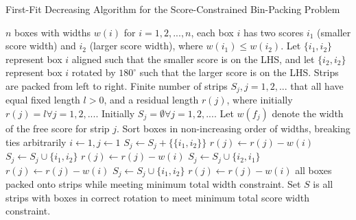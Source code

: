 \documentclass[oribibl]{llncs}
\begin{document}
\begin{algorithm}[H]
\caption{First-Fit Decreasing Algorithm for the Score-Constrained Bin-Packing Problem}
\label{alg:ffdapprox}
	\begin{algorithmic}[1]
	\Require $n$ boxes with widths $w(i)$ for $i = 1,2,...,n$, each box $i$ has two scores $i_1$ (smaller score width) and $i_2$ (larger score width), where $w(i_1) \leq w(i_2)$. Let $\{i_1, i_2\}$ represent box $i$ aligned such that the smaller score is on the LHS, and let $\{i_2, i_2\}$ represent box $i$ rotated by $180^{\circ}$ such that the larger score is on the LHS. Strips are packed from left to right. Finite number of strips $S_j, j = 1, 2, ...$ that all have equal fixed length $l > 0$, and a residual length $r(j)$, where initially $r(j) = l \forall j = 1, 2, ...$. Initially $S_j = \emptyset \forall j = 1, 2,...$. Let $w(f_j)$ denote the width of the free score for strip $j$.   
	\State Sort boxes in non-increasing order of widths, breaking ties arbitrarily
	\State $i \gets 1, j \gets 1$
	\State $S_j \gets S_j + \{\{i_1, i_2\}\}$
	\State $r(j) \gets r(j) - w(i)$
					\IndIndIndStatex $S_j \gets S_j \cup \{i_1, i_2\}$
					\IndIndIndStatex $r(j) \gets r(j) - w(i)$
					\IndIndIndStatex \Break
					\IndIndIndStatex $S_j \gets S_j \cup \{i_2, i_1\}$
					\IndIndIndStatex $r(j) \gets r(j) - w(i)$
					\IndIndIndStatex \Break					
				\EndIf
				\IndIndStatex $S_j \gets S_j \cup \{i_1, i_2\}$
				\IndIndStatex $r(j) \gets r(j) - w(i)$
				\IndIndStatex \Break
			\EndIf
		\EndFor
	\EndFor		
	\Ensure all boxes packed onto strips while meeting minimum total width constraint. Set $S$ is all strips with boxes in correct rotation to meet minimum total score width constraint.	
	\end{algorithmic}	
\end{algorithm}
\end{document}
